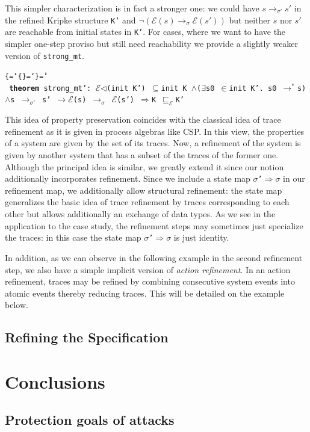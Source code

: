 \documentclass{llncs}
\newenvironment{ttbox}{\begin{alltt}\ttbraces\small\tt}%
                      {\end{alltt}}
\def\ttbraces{\let\.=\nobreak\chardef\{=`\{\chardef\}=`\}\chardef\|=`\\}
\newcommand\ttand{\mbox{{$\land$}}}
\newcommand\ttfun{\mbox{{$\Rightarrow$}}}
\newcommand\ttimp{\mbox{{$\longrightarrow$}}}
\newcommand\ttexists{\mbox{{$\exists$}}}
\newcommand\ttin{\mbox{{$\in$}}}
\newcommand\ttImp{\mbox{{$\Longrightarrow$}}}
\newcommand\ttrelIstar{\mbox{{$\to^*$}}}
\newcommand\ttrel[1]{\mbox{{$\to_{#1}$}}}
\newcommand\ttsubseteq{\mbox{{$\subseteq$}}}
\newcommand\ttsigma{\mbox{{$\sigma$}}}
\newcommand\ttmref[1]{\mbox{{$\sqsubseteq_{#1}$}}}
\newcommand\ttmeref{\ttmref{\mathcal{E}}}
\newcommand\ttecal{\mbox{$\mathcal{E}$}}
\newcommand\ttimg{\mbox{$\triangleleft$}}
\begin{document}
This simpler characterization is in fact a stronger one: we could have $s \ttrel{\sigma'} s'$ 
in the refined Kripke structure \texttt{K'} and $\neg(\ttecal(s) \ttrel{\sigma} \ttecal(s'))$
but neither $s$ nor $s'$ are reachable from initial states in \texttt{K'}.
For cases, where we want to have the simpler one-step proviso but still need 
reachability we provide a slightly weaker version of \texttt{strong\_mt}.
\begin{ttbox}
{\bf{theorem}} strong_mt':  
\ttecal\ttimg(init K') \ttsubseteq init K \ttand (\ttexists s0 \ttin init K'. s0  \ttrelIstar s)
 \ttand s \ttrel{\sigma'} s' \ttimp \ttecal(s) \ttrel{\sigma} \ttecal(s') \ttImp K \ttmeref K'
\end{ttbox}

This idea of property preservation coincides with the classical idea of
trace refinement as it is given in process algebras like CSP. In this view,
the properties of a system are given by the set of its traces. Now, a refinement
of the system is given by another system that has a subset of the traces of the 
former one.
Although the principal idea is similar, we greatly extend it since our notion
additionally incorporates refinement. Since we include a state map 
\texttt{\ttsigma'\ttfun \ttsigma} in our refinement map, we additionally
allow structural refinement: the state map generalizes the basic idea of
trace refinement by traces corresponding to each other but allows additionally
an exchange of data types. 
As we see in the application to the case study, the refinement steps may
sometimes just specialize the traces: in this case the state map 
\texttt{\ttsigma'\ttfun \ttsigma} is just identity. 

In addition, as we can observe in the following example in the second refinement
step, we also have a simple implicit version of {\it action refinement}. In an
action refinement, traces may be refined by combining consecutive system events
into atomic events thereby reducing traces. This will be detailed on the example
below.

\subsection{Refining the Specification}
\label{sec:corref}

\section{Conclusions}
\label{sec:concl}
\subsection{Protection goals of attacks}
\end{document}
